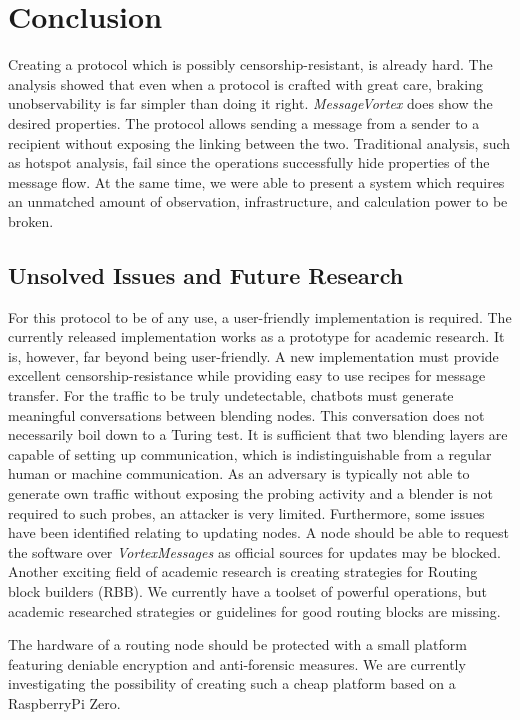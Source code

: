 \documentclass[acmsmall, screen]{acmart}
\begin{document}
\section{Conclusion}
Creating a protocol which is possibly censorship-resistant, is already hard. The analysis showed that even when a protocol is crafted with great care, braking unobservability is far simpler than doing it right. \emph{MessageVortex} does show the desired properties. The protocol allows sending a message from a sender to a recipient without exposing the linking between the two. Traditional analysis, such as hotspot analysis, fail since the operations successfully hide properties of the message flow. At the same time, we were able to present a system which requires an unmatched amount of observation, infrastructure, and calculation power to be broken.

\subsection{Unsolved Issues and Future Research}
For this protocol to be of any use, a user-friendly implementation is required. The currently released implementation works as a prototype for academic research. It is, however, far beyond being user-friendly. A new implementation must provide excellent censorship-resistance while providing easy to use recipes for message transfer.  For the traffic to be truly undetectable, chatbots must generate meaningful conversations between blending nodes. This conversation does not necessarily boil down to a Turing test. It is sufficient that two blending layers are capable of setting up communication, which is indistinguishable from a regular human or machine communication. As an adversary is typically not able to generate own traffic without exposing the probing activity and a blender is not required to such probes, an attacker is very limited. Furthermore, some issues have been identified relating to updating nodes. A node should be able to request the software over \emph{VortexMessages} as official sources for updates may be blocked. Another exciting field of academic research is creating strategies for Routing block builders (RBB). We currently have a toolset of powerful operations, but academic researched strategies or guidelines for good routing blocks are missing. 

The hardware of a routing node should be protected with a small platform featuring deniable encryption and anti-forensic measures. We are currently investigating the possibility of creating such a cheap platform based on a RaspberryPi Zero.
\end{document}
